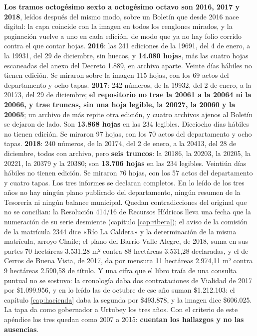 \textbf{Los tramos octogésimo sexto a octogésimo octavo son 2016, 2017 y 2018}, leídos después del mismo modo, sobre un Boletín que desde 2016 nace digital: la capa coincide con la imagen en todos los renglones mirados, y la paginación vuelve a uno en cada edición, de modo que ya no hay folio corrido contra el que contar hojas. \textbf{2016}: las 241 ediciones de la 19691, del 4 de enero, a la 19931, del 29 de diciembre, sin huecos, y \textbf{14.080 hojas}, más las cuatro hojas escaneadas del anexo del Decreto 1.889, en archivo aparte. Veinte días hábiles no tienen edición. Se miraron sobre la imagen 115 hojas, con los 69 actos del departamento y ocho tapas. \textbf{2017}: 242 números, de la 19932, del 2 de enero, a la 20173, del 29 de diciembre; \textbf{el repositorio no trae la 20061 a la 20064 ni la 20066, y trae truncas, sin una hoja legible, la 20027, la 20060 y la 20065}; un archivo de más repite otra edición, y cuatro archivos ajenos al Boletín se dejaron de lado. Son \textbf{13.868 hojas} en las 234 legibles. Dieciocho días hábiles no tienen edición. Se miraron 97 hojas, con los 70 actos del departamento y ocho tapas. \textbf{2018}: 240 números, de la 20174, del 2 de enero, a la 20413, del 28 de diciembre, todos con archivo, pero \textbf{seis truncos}: la 20186, la 20203, la 20205, la 20221, la 20379 y la 20380; son \textbf{13.706 hojas} en las 234 legibles. Veintiún días hábiles no tienen edición. Se miraron 76 hojas, con los 57 actos del departamento y cuatro tapas. Los tres informes se declaran completos. En lo leído de los tres años no hay ningún plano publicado del departamento, ningún resumen de la Tesorería ni ningún balance municipal. Quedan contradicciones del original que no se concilian: la Resolución 414/16 de Recursos Hídricos lleva una fecha que la numeración de su serie desmiente (capítulo \ref{cap:ribera}); el aviso de la comisión de la matrícula 2344 dice «Río La Caldera» y la determinación de la misma matrícula, arroyo Chaile; el plano del Barrio Valle Alegre, de 2018, suma en sus partes 70 hectáreas 3.531,28 m² contra 88 hectáreas 3.531,28 declaradas, y el de Cerros de Buena Vista, de 2017, da por mensura 11 hectáreas 2.974,11 m² contra 9 hectáreas 2.590,58 de título. Y una cifra que el libro traía de una consulta puntual no se sostuvo: la cronología daba dos contrataciones de Vialidad de 2017 por \$1.099.956, y en lo leído las de octubre de ese año suman \$1.212.103: el capítulo \ref{cap:hacienda} daba la segunda por \$493.878, y la imagen dice \$606.025. La tapa da como gobernador a Urtubey los tres años. Con el criterio de este apéndice los tres quedan como 2007 a 2015: \textbf{cuentan los hallazgos y no las ausencias}.

